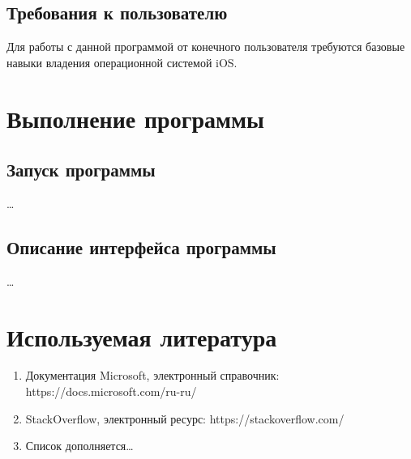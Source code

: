 \documentclass{../includes/TechDoc}
\begin{document}
    \subsection{Требования к пользователю}

    Для работы с данной программой от конечного пользователя требуются базовые навыки владения
    операционной системой iOS.


    \section{Выполнение программы}

    \subsection{Запуск программы}

    \ldots

    \subsection{Описание интерфейса программы}

    \ldots


    \section{Используемая литература}

    \begin{enumerate}
        \item Документация Microsoft, электронный справочник: https://docs.microsoft.com/ru-ru/
        \item StackOverflow, электронный ресурс: https://stackoverflow.com/
        \item Список дополняется\ldots
    \end{enumerate}


    \registrationList
\end{document}
